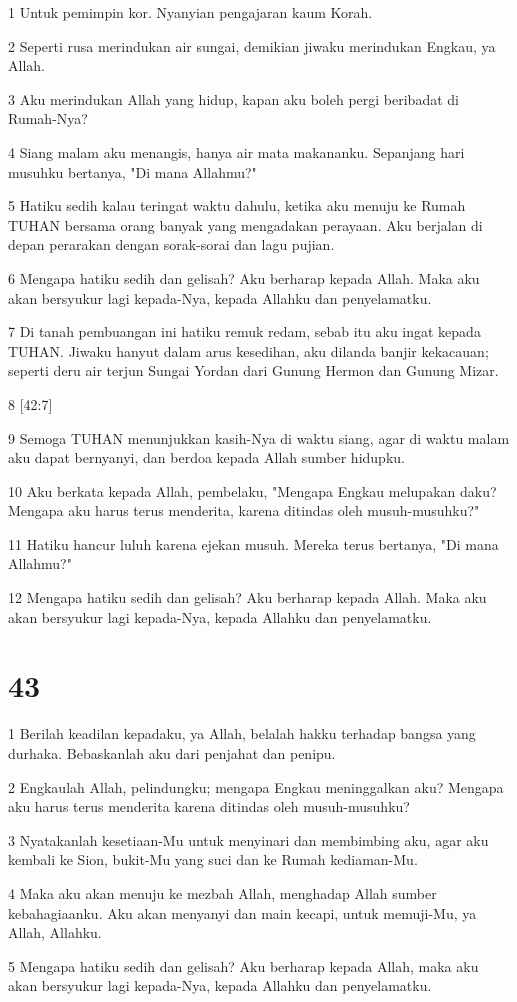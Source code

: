 \par 1 Untuk pemimpin kor. Nyanyian pengajaran kaum Korah.
\par 2 Seperti rusa merindukan air sungai, demikian jiwaku merindukan Engkau, ya Allah.
\par 3 Aku merindukan Allah yang hidup, kapan aku boleh pergi beribadat di Rumah-Nya?
\par 4 Siang malam aku menangis, hanya air mata makananku. Sepanjang hari musuhku bertanya, "Di mana Allahmu?"
\par 5 Hatiku sedih kalau teringat waktu dahulu, ketika aku menuju ke Rumah TUHAN bersama orang banyak yang mengadakan perayaan. Aku berjalan di depan perarakan dengan sorak-sorai dan lagu pujian.
\par 6 Mengapa hatiku sedih dan gelisah? Aku berharap kepada Allah. Maka aku akan bersyukur lagi kepada-Nya, kepada Allahku dan penyelamatku.
\par 7 Di tanah pembuangan ini hatiku remuk redam, sebab itu aku ingat kepada TUHAN. Jiwaku hanyut dalam arus kesedihan, aku dilanda banjir kekacauan; seperti deru air terjun Sungai Yordan dari Gunung Hermon dan Gunung Mizar.
\par 8 [42:7]
\par 9 Semoga TUHAN menunjukkan kasih-Nya di waktu siang, agar di waktu malam aku dapat bernyanyi, dan berdoa kepada Allah sumber hidupku.
\par 10 Aku berkata kepada Allah, pembelaku, "Mengapa Engkau melupakan daku? Mengapa aku harus terus menderita, karena ditindas oleh musuh-musuhku?"
\par 11 Hatiku hancur luluh karena ejekan musuh. Mereka terus bertanya, "Di mana Allahmu?"
\par 12 Mengapa hatiku sedih dan gelisah? Aku berharap kepada Allah. Maka aku akan bersyukur lagi kepada-Nya, kepada Allahku dan penyelamatku.

\chapter{43}

\par 1 Berilah keadilan kepadaku, ya Allah, belalah hakku terhadap bangsa yang durhaka. Bebaskanlah aku dari penjahat dan penipu.
\par 2 Engkaulah Allah, pelindungku; mengapa Engkau meninggalkan aku? Mengapa aku harus terus menderita karena ditindas oleh musuh-musuhku?
\par 3 Nyatakanlah kesetiaan-Mu untuk menyinari dan membimbing aku, agar aku kembali ke Sion, bukit-Mu yang suci dan ke Rumah kediaman-Mu.
\par 4 Maka aku akan menuju ke mezbah Allah, menghadap Allah sumber kebahagiaanku. Aku akan menyanyi dan main kecapi, untuk memuji-Mu, ya Allah, Allahku.
\par 5 Mengapa hatiku sedih dan gelisah? Aku berharap kepada Allah, maka aku akan bersyukur lagi kepada-Nya, kepada Allahku dan penyelamatku.

